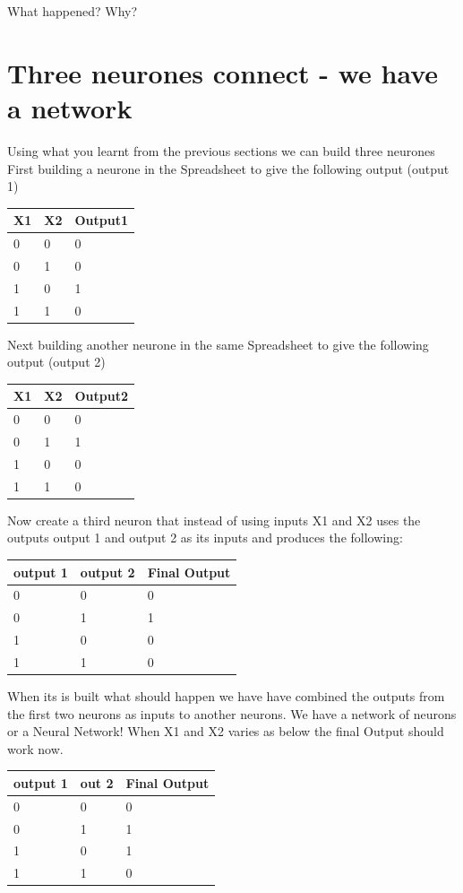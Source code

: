 What happened? Why?

\section{Three neurones connect - we have a network}
Using what you learnt from the previous sections we can build three neurones
\newline
First building a neurone in the Spreadsheet to give the following output (output 1)
\begin{tabular}{lll} \hline
X1 & X2 & Output1	 	 \\ \hline
0  & 0  & 0 \\ \hline
0  & 1	& 0 \\ \hline  
1  & 0	& 1 \\ \hline
1  & 1	& 0 \\ \hline
\end{tabular}
\newline
Next building another neurone in the same Spreadsheet to give the following output (output 2)
\begin{tabular}{lll} \hline
X1 & X2 & Output2	 	 \\ \hline
0  & 0  & 0 \\ \hline
0  & 1	& 1 \\ \hline  
1  & 0	& 0 \\ \hline
1  & 1	& 0 \\ \hline
\end{tabular}

\newline
Now create a third neuron that instead of using inputs X1 and X2 uses the outputs output 1 and output 2 as its inputs and produces the following:
\begin{tabular}{lll} \hline
output 1 & output 2 & Final Output	 	 \\ \hline
0  & 0  & 0 \\ \hline
0  & 1	& 1 \\ \hline  
1  & 0	& 0 \\ \hline
1  & 1	& 0 \\ \hline
\end{tabular}
When its is built what should happen we have have combined the outputs from the first two neurons as inputs to another neurons. We have a network of neurons or a Neural Network!
\newline 
When X1 and X2 varies as below the final Output should work now.
\begin{tabular}{lll} \hline
output 1 & out 2 & Final Output	 	 \\ \hline
0  & 0  & 0 \\ \hline
0  & 1	& 1 \\ \hline  
1  & 0	& 1 \\ \hline
1  & 1	& 0 \\ \hline
\end{tabular}



\newline